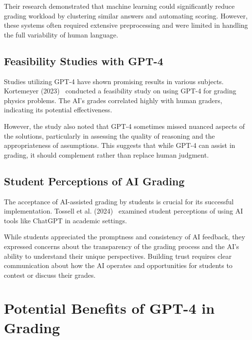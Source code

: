 \documentclass[ms,twoside,print]{nuthesis}
\begin{document}
Their research demonstrated that machine learning could significantly reduce grading workload by clustering similar answers and automating scoring. However, these systems often required extensive preprocessing and were limited in handling the full variability of human language.

\subsection{Feasibility Studies with GPT-4}

Studies utilizing GPT-4 have shown promising results in various subjects. Kortemeyer (2023)~\cite{Kortemeyer2023} conducted a feasibility study on using GPT-4 for grading physics problems. The AI's grades correlated highly with human graders, indicating its potential effectiveness. %

However, the study also noted that GPT-4 sometimes missed nuanced aspects of the solutions, particularly in assessing the quality of reasoning and the appropriateness of assumptions. This suggests that while GPT-4 can assist in grading, it should complement rather than replace human judgment. %

\subsection{Student Perceptions of AI Grading}

The acceptance of AI-assisted grading by students is crucial for its successful implementation. Tossell et al. (2024)~\cite{Tossell2024} examined student perceptions of using AI tools like ChatGPT in academic settings.

While students appreciated the promptness and consistency of AI feedback, they expressed concerns about the transparency of the grading process and the AI's ability to understand their unique perspectives. Building trust requires clear communication about how the AI operates and opportunities for students to contest or discuss their grades. %

\section{Potential Benefits of GPT-4 in Grading}
\end{document}
